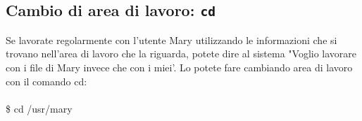 \subsection{Cambio di area di lavoro: \texttt{cd}}
Se lavorate regolarmente con l'utente Mary utilizzando le informazioni che si trovano 
nell'area di lavoro che la riguarda, potete dire al sistema "Voglio lavorare con i file 
di Mary invece che con i miei'. Lo potete fare cambiando area di lavoro con il comando 
cd:\\\\
\$ cd /usr/mary\\\\